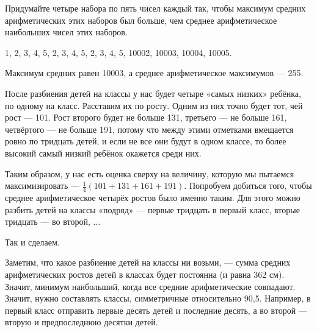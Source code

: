 
\begin{itemize}
\itA Придумайте четыре набора по пять чисел каждый так, чтобы максимум средних арифметических этих наборов был больше, чем среднее арифметическое наибольших чисел этих наборов.

1, 2, 3, 4, 5, 2, 3, 4, 5, 2, 3, 4, 5, 10002, 10003, 10004, 10005.

Максимум средних равен 10003, а среднее арифметическое максимумов — 255.

\itB После разбиения детей на классы у нас будет четыре «самых низких» ребёнка, по одному на класс. Расставим их по росту. Одним из них точно будет тот, чей рост — \SI{101}{}. Рост второго будет не больше 131, третьего — не больше 161, четвёртого — не больше 191, потому что между этими отметками вмещается ровно по тридцать детей, и если не все они будут в одном классе, то более высокий самый низкий ребёнок окажется среди них.

Таким образом, у нас есть оценка сверху на величину, которую мы пытаемся максимизировать — $\tfrac{1}{4}(101+131+161+191)$. Попробуем добиться того, чтобы среднее арифметическое четырёх ростов было именно таким. Для этого можно разбить детей на классы «подряд» — первые тридцать в первый класс, вторые тридцать — во второй, $\ldots$

Так и сделаем.

\itC Заметим, что какое разбиение детей на классы ни возьми, — сумма средних арифметических ростов детей в классах будет постоянна (и равна 362 см). Значит, минимум наибольший, когда все средние арифметические совпадают. Значит, нужно составлять классы, симметричные относительно 90,5. Например, в первый класс отправить первые десять детей и последние десять, а во второй — вторую и предпоследнюю десятки детей.
\end{itemize}